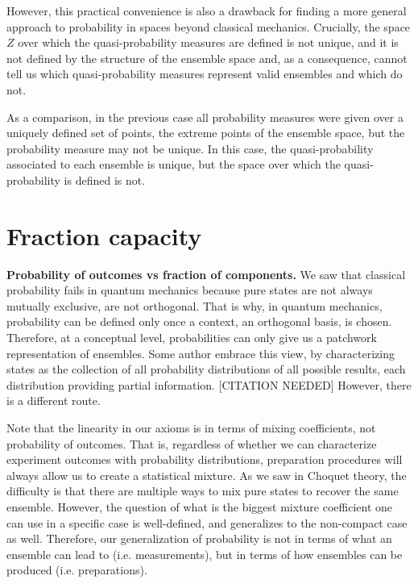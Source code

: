 \documentclass[10pt,twocolumn, nofootinbib]{revtex4-2}
\begin{document}
However, this practical convenience is also a drawback for finding a more general approach to probability in spaces beyond classical mechanics. Crucially, the space $Z$ over which the quasi-probability measures are defined is not unique, and it is not defined by the structure of the ensemble space and, as a consequence, cannot tell us which quasi-probability measures represent valid ensembles and which do not.

As a comparison, in the previous case all probability measures were given over a uniquely defined set of points, the extreme points of the ensemble space, but the probability measure may not be unique. In this case, the quasi-probability associated to each ensemble is unique, but the space over which the quasi-probability is defined is not.

\section{Fraction capacity}

\textbf{Probability of outcomes vs fraction of components.} We saw that classical probability fails in quantum mechanics because pure states are not always mutually exclusive, are not orthogonal. That is why, in quantum mechanics, probability can be defined only once a context, an orthogonal basis, is chosen. Therefore, at a conceptual level, probabilities can only give us a patchwork representation of ensembles. Some author embrace this view, by characterizing states as the collection of all probability distributions of all possible results, each distribution providing partial information. [CITATION NEEDED] However, there is a different route.

Note that the linearity in our axioms is in terms of mixing coefficients, not probability of outcomes. That is, regardless of whether we can characterize experiment outcomes with probability distributions, preparation procedures will always allow us to create a statistical mixture. As we saw in Choquet theory, the difficulty is that there are multiple ways to mix pure states to recover the same ensemble. However, the question of what is the biggest mixture coefficient one can use in a specific case is well-defined, and generalizes to the non-compact case as well. Therefore, our generalization of probability is not in terms of what an ensemble can lead to (i.e. measurements), but in terms of how ensembles can be produced (i.e. preparations).
\end{document}
